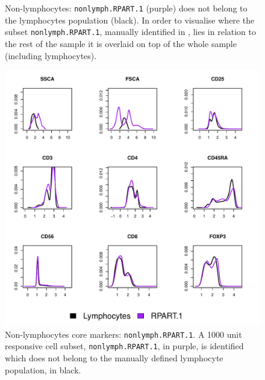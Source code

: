 \begin{figure}[!h]
\begin{minipage}{.6\textwidth}
\end{minipage}
\begin{minipage}{.3\textwidth}
{ Non-lymphocytes:  \texttt{nonlymph.RPART.1} (purple) does not belong to the lymphocytes population (black).  }
{
In order to visualise where the subset \texttt{nonlymph.RPART.1}, manually identified in , lies in relation to the rest of the sample it is overlaid on top of the whole sample (including lymphocytes).
}
\end{minipage}
\end{figure}

\begin{figure}
  \centering
\begin{minipage}{.9\textwidth}
\includegraphics[width=\linewidth]{figures/rpart-nonlymphocytes-clusters}
{ Non-lymphocytes core markers: \texttt{nonlymph.RPART.1}. }
{
  A 1000 unit responsive cell subset, \texttt{nonlymph.RPART.1}, in purple, is identified which does not belong to the manually defined lymphocyte population, in black. 
}
\end{minipage}
\end{figure}
